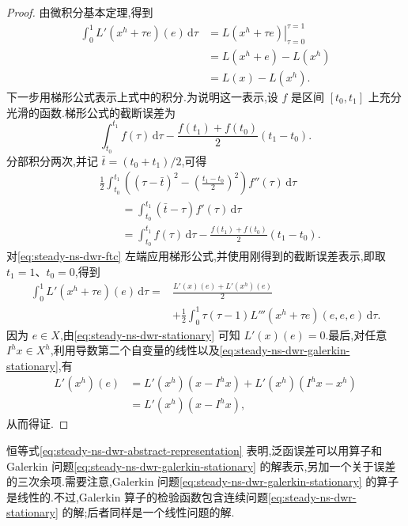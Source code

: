 \begin{proof}
由微积分基本定理,得到
\begin{equation}\label{eq:steady-ns-dwr-ftc}
\begin{aligned}
  \int_0^1 L'(x^h+\tau e)(e)\,\mathrm{d}\tau
  &=\left.L(x^h+\tau e)\right|_{\tau=0}^{\tau=1}\\
  &=L(x^h+e)-L(x^h)\\
  &=L(x)-L(x^h).
\end{aligned}
\end{equation}
下一步用梯形公式表示上式中的积分.为说明这一表示,设 $f$ 是区间 $[t_0,t_1]$ 上充分光滑的函数.梯形公式的截断误差为
\[
  \int_{t_0}^{t_1}f(\tau)\,\mathrm{d}\tau
  -\frac{f(t_1)+f(t_0)}{2}(t_1-t_0).
\]
分部积分两次,并记 $\bar t=(t_0+t_1)/2$,可得
\begin{align*}
  &\frac12\int_{t_0}^{t_1}
    \left((\tau-\bar t)^2-\left(\frac{t_1-t_0}{2}\right)^2\right)
    f''(\tau)\,\mathrm{d}\tau\\
  &\qquad=\int_{t_0}^{t_1}(\bar t-\tau)f'(\tau)\,\mathrm{d}\tau\\
  &\qquad=\int_{t_0}^{t_1}f(\tau)\,\mathrm{d}\tau
    -\frac{f(t_1)+f(t_0)}{2}(t_1-t_0).
\end{align*}
对\cref{eq:steady-ns-dwr-ftc} 左端应用梯形公式,并使用刚得到的截断误差表示,即取 $t_1=1$、$t_0=0$,得到
\[
\begin{aligned}
  \int_0^1L'(x^h+\tau e)(e)\,\mathrm{d}\tau
  ={}&\frac{L'(x)(e)+L'(x^h)(e)}{2}\\
    &+\frac12\int_0^1\tau(\tau-1)
      L'''(x^h+\tau e)(e,e,e)\,\mathrm{d}\tau.
\end{aligned}
\]
因为 $e\in X$,由\cref{eq:steady-ns-dwr-stationary} 可知 $L'(x)(e)=0$.最后,对任意 $I^h x\in X^h$,利用导数第二个自变量的线性以及\cref{eq:steady-ns-dwr-galerkin-stationary},有
\[
\begin{aligned}
  L'(x^h)(e)
   &=L'(x^h)(x-I^h x)+L'(x^h)(I^h x-x^h)\\
   &=L'(x^h)(x-I^h x),
\end{aligned}
\]
从而得证.
\end{proof}

\begin{note}\label{note:steady-ns-dwr-abstract-interpretation}
恒等式\cref{eq:steady-ns-dwr-abstract-representation} 表明,泛函误差可以用算子和 Galerkin 问题\cref{eq:steady-ns-dwr-galerkin-stationary} 的解表示,另加一个关于误差的三次余项.需要注意,Galerkin 问题\cref{eq:steady-ns-dwr-galerkin-stationary} 的算子是线性的.不过,Galerkin 算子的检验函数包含连续问题\cref{eq:steady-ns-dwr-stationary} 的解;后者同样是一个线性问题的解.
\end{note}

